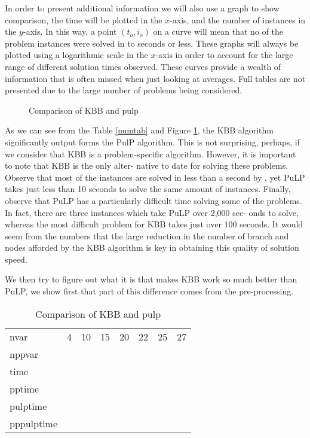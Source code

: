 \documentclass[a4paper,11pt]{article}
\begin{document}
In order to present additional information we will also use a graph to show comparison, the time will be plotted in the $x$-axis, and the number of instances in the $y$-axis. In this way, a point $(t_o,i_o)$ on a curve will mean that no of the problem instances were solved in to seconds or less. These graphs will always be plotted using a logarithmic scale in the $x$-axis in order to account for the large range of different solution times observed. These curves provide a wealth of information that is often missed when just looking at averages. Full tables are not presented due to the large number of problems being considered.

\begin{figure}[H]
\begin{center}
\end{center}
\caption{Comparison of KBB and pulp \label{numfig}}
\end{figure}

As we can see from the Table \ref{numtab} and Figure \ref{numfig}, the KBB algorithm significantly output forms the PulP algorithm. This is not surprising, perhaps, if we consider that KBB is a problem-specific algorithm. However, it is important to note that KBB is the only alter- native to date for solving these problems. Observe that most of the instances are solved in less than a second by , yet PuLP takes just less than 10 seconds to solve the same amount of instances. Finally, observe that PuLP has a particularly difficult time solving some of the problems. In fact, there are three instances which take PuLP over 2,000 sec- onds to solve, whereas the most difficult problem for KBB takes just over 100 seconds. It would seem from the numbers that the large reduction in the number of branch and nodes afforded by the KBB algorithm is key in obtaining this quality of solution speed.

We then try to figure out what it is that makes KBB work so much better than PuLP,  we show first that part of this difference comes from the pre-processing.
\begin{table}[H]
\begin{center}
\begin{tabular}{l c c c c c c c}
\hline
nvar&4&10&15&20&22&25&27\\
nppvar\\
time\\
pptime\\
pulptime\\
pppulptime\\
\hline
\end{tabular}
\end{center}
\caption{Comparison of KBB and pulp\label{numtabp}}
\end{table}
\end{document}
